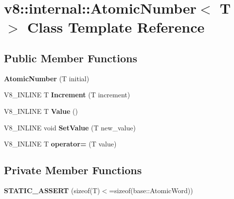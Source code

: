 \hypertarget{classv8_1_1internal_1_1_atomic_number}{}\section{v8\+:\+:internal\+:\+:Atomic\+Number$<$ T $>$ Class Template Reference}
\label{classv8_1_1internal_1_1_atomic_number}
\subsection*{Public Member Functions}
\begin{DoxyCompactItemize}
\item 
{\bfseries Atomic\+Number} (T initial)\hypertarget{classv8_1_1internal_1_1_atomic_number_a720ef62102da75f17919ffd636fbacce}{}\label{classv8_1_1internal_1_1_atomic_number_a720ef62102da75f17919ffd636fbacce}

\item 
V8\+\_\+\+I\+N\+L\+I\+NE T {\bfseries Increment} (T increment)\hypertarget{classv8_1_1internal_1_1_atomic_number_ac84970118d9b6989f58a971fde4bd690}{}\label{classv8_1_1internal_1_1_atomic_number_ac84970118d9b6989f58a971fde4bd690}

\item 
V8\+\_\+\+I\+N\+L\+I\+NE T {\bfseries Value} ()\hypertarget{classv8_1_1internal_1_1_atomic_number_a7e471ee4c4b3a96816d849817d34d7cf}{}\label{classv8_1_1internal_1_1_atomic_number_a7e471ee4c4b3a96816d849817d34d7cf}

\item 
V8\+\_\+\+I\+N\+L\+I\+NE void {\bfseries Set\+Value} (T new\+\_\+value)\hypertarget{classv8_1_1internal_1_1_atomic_number_a60d37a9fb8e86f67cf70daedc1d12524}{}\label{classv8_1_1internal_1_1_atomic_number_a60d37a9fb8e86f67cf70daedc1d12524}

\item 
V8\+\_\+\+I\+N\+L\+I\+NE T {\bfseries operator=} (T value)\hypertarget{classv8_1_1internal_1_1_atomic_number_a1cd1953c8ed9e45c69240c6bc5fe0c1c}{}\label{classv8_1_1internal_1_1_atomic_number_a1cd1953c8ed9e45c69240c6bc5fe0c1c}

\end{DoxyCompactItemize}
\subsection*{Private Member Functions}
\begin{DoxyCompactItemize}
\item 
{\bfseries S\+T\+A\+T\+I\+C\+\_\+\+A\+S\+S\+E\+RT} (sizeof(T)$<$=sizeof(base\+::\+Atomic\+Word))\hypertarget{classv8_1_1internal_1_1_atomic_number_a51d548052252f338b5e881949994f69b}{}\label{classv8_1_1internal_1_1_atomic_number_a51d548052252f338b5e881949994f69b}

\end{DoxyCompactItemize}
